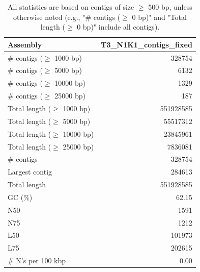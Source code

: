 \documentclass[12pt,a4paper]{article}
\begin{document}
\begin{table}[ht]
\begin{center}
\caption{All statistics are based on contigs of size $\geq$ 500 bp, unless otherwise noted (e.g., "\# contigs ($\geq$ 0 bp)" and "Total length ($\geq$ 0 bp)" include all contigs).}
\begin{tabular}{|l*{1}{|r}|}
\hline
Assembly & T3\_N1K1\_contigs\_fixed \\ \hline
\# contigs ($\geq$ 1000 bp) & 328754 \\ \hline
\# contigs ($\geq$ 5000 bp) & 6132 \\ \hline
\# contigs ($\geq$ 10000 bp) & 1329 \\ \hline
\# contigs ($\geq$ 25000 bp) & 187 \\ \hline
Total length ($\geq$ 1000 bp) & 551928585 \\ \hline
Total length ($\geq$ 5000 bp) & 55517312 \\ \hline
Total length ($\geq$ 10000 bp) & 23845961 \\ \hline
Total length ($\geq$ 25000 bp) & 7836081 \\ \hline
\# contigs & 328754 \\ \hline
Largest contig & 284613 \\ \hline
Total length & 551928585 \\ \hline
GC (\%) & 62.15 \\ \hline
N50 & 1591 \\ \hline
N75 & 1212 \\ \hline
L50 & 101973 \\ \hline
L75 & 202615 \\ \hline
\# N's per 100 kbp & 0.00 \\ \hline
\end{tabular}
\end{center}
\end{table}
\end{document}
